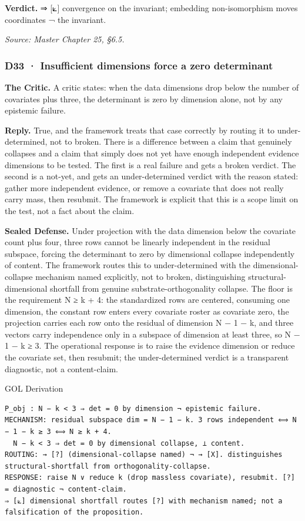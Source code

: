 \documentclass[10pt,twocolumn]{article}
\begin{document}
\textbf{Verdict.} ⇒ {[}⟀{]} convergence on the invariant; embedding
non-isomorphism moves coordinates ¬ the invariant.

\emph{Source: Master Chapter 25, §6.5.}

\hypertarget{d33-insufficient-dimensions-force-a-zero-determinant}{%
\subsubsection{D33 · Insufficient dimensions force a zero
determinant}\label{d33-insufficient-dimensions-force-a-zero-determinant}}

\textbf{The Critic.} A critic states: when the data dimensions drop
below the number of covariates plus three, the determinant is zero by
dimension alone, not by any epistemic failure.

\textbf{Reply.} True, and the framework treats that case correctly by
routing it to under-determined, not to broken. There is a difference
between a claim that genuinely collapses and a claim that simply does
not yet have enough independent evidence dimensions to be tested. The
first is a real failure and gets a broken verdict. The second is a
not-yet, and gets an under-determined verdict with the reason stated:
gather more independent evidence, or remove a covariate that does not
really carry mass, then resubmit. The framework is explicit that this is
a scope limit on the test, not a fact about the claim.

\textbf{Sealed Defense.} Under projection with the data dimension below
the covariate count plus four, three rows cannot be linearly independent
in the residual subspace, forcing the determinant to zero by dimensional
collapse independently of content. The framework routes this to
under-determined with the dimensional-collapse mechanism named
explicitly, not to broken, distinguishing structural-dimensional
shortfall from genuine substrate-orthogonality collapse. The floor is
the requirement N ≥ k + 4: the standardized rows are centered, consuming
one dimension, the constant row enters every covariate roster as
covariate zero, the projection carries each row onto the residual of
dimension N − 1 − k, and three vectors carry independence only in a
subspace of dimension at least three, so N − 1 − k ≥ 3. The operational
response is to raise the evidence dimension or reduce the covariate set,
then resubmit; the under-determined verdict is a transparent diagnostic,
not a content-claim.

\begin{golbox}{GOL Derivation}
\begin{lstlisting}[style=golv]
P_obj : N − k < 3 ⇒ det = 0 by dimension ¬ epistemic failure.
MECHANISM: residual subspace dim = N − 1 − k. 3 rows independent ⟺ N − 1 − k ≥ 3 ⟺ N ≥ k + 4.
  N − k < 3 ⇒ det = 0 by dimensional collapse, ⊥ content.
ROUTING: → [?] (dimensional-collapse named) ¬ → [X]. distinguishes structural-shortfall from orthogonality-collapse.
RESPONSE: raise N ∨ reduce k (drop massless covariate), resubmit. [?] = diagnostic ¬ content-claim.
⇒ [⟀] dimensional shortfall routes [?] with mechanism named; not a falsification of the proposition.
\end{lstlisting}
\end{golbox}
\end{document}
